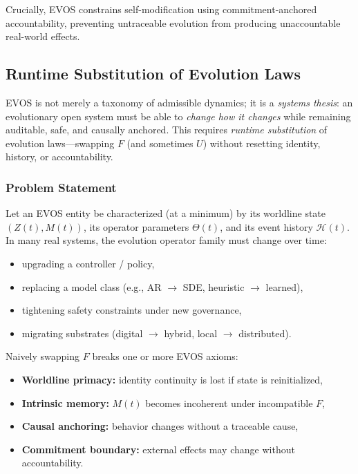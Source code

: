 \documentclass[11pt]{article}
\begin{document}
Crucially, EVOS constrains self-modification using commitment-anchored accountability,
preventing untraceable evolution from producing unaccountable real-world effects.



\vspace{3mm}

\subsection{Runtime Substitution of Evolution Laws}
\label{sec:runtime-substitution}

EVOS is not merely a taxonomy of admissible dynamics; it is a \emph{systems thesis}:
an evolutionary open system must be able to \emph{change how it changes} while remaining
auditable, safe, and causally anchored. This requires \emph{runtime substitution} of
evolution laws---swapping $F$ (and sometimes $U$) without resetting identity, history,
or accountability.

\subsubsection{Problem Statement}
\label{sec:hot-swap-problem}

Let an EVOS entity be characterized (at a minimum) by its worldline state $(Z(t),M(t))$,
its operator parameters $\Theta(t)$, and its event history $\mathcal{H}(t)$.
In many real systems, the evolution operator family must change over time:
\begin{itemize}
  \item upgrading a controller / policy,
  \item replacing a model class (e.g., AR $\rightarrow$ SDE, heuristic $\rightarrow$ learned),
  \item tightening safety constraints under new governance,
  \item migrating substrates (digital $\rightarrow$ hybrid, local $\rightarrow$ distributed).
\end{itemize}

Naively swapping $F$ breaks one or more EVOS axioms:
\begin{itemize}
  \item \textbf{Worldline primacy:} identity continuity is lost if state is reinitialized,
  \item \textbf{Intrinsic memory:} $M(t)$ becomes incoherent under incompatible $F$,
  \item \textbf{Causal anchoring:} behavior changes without a traceable cause,
  \item \textbf{Commitment boundary:} external effects may change without accountability.
\end{itemize}
\end{document}
